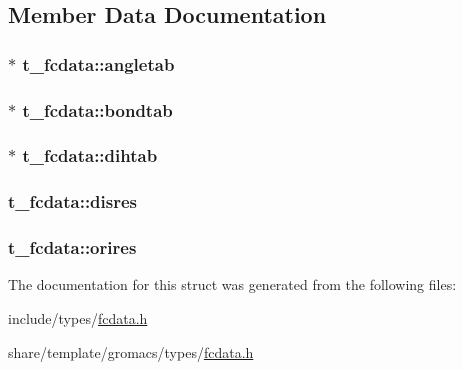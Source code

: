 \subsection{\-Member \-Data \-Documentation}
\hypertarget{structt__fcdata_abb2c29b026665e40a5e70234c55b2d51}{
\subsubsection[{angletab}]{ $\ast$ {\bf t\-\_\-fcdata\-::angletab}}}\label{structt__fcdata_abb2c29b026665e40a5e70234c55b2d51}
\hypertarget{structt__fcdata_a4efc8f3e6f22eae188fac8fedf865382}{
\subsubsection[{bondtab}]{ $\ast$ {\bf t\-\_\-fcdata\-::bondtab}}}\label{structt__fcdata_a4efc8f3e6f22eae188fac8fedf865382}
\hypertarget{structt__fcdata_a6342da34fb6df67d3d2e3babeaaae3ec}{
\subsubsection[{dihtab}]{ $\ast$ {\bf t\-\_\-fcdata\-::dihtab}}}\label{structt__fcdata_a6342da34fb6df67d3d2e3babeaaae3ec}
\hypertarget{structt__fcdata_ab08031231076f48cbbc06a2e852fd6ba}{
\subsubsection[{disres}]{ {\bf t\-\_\-fcdata\-::disres}}}\label{structt__fcdata_ab08031231076f48cbbc06a2e852fd6ba}
\hypertarget{structt__fcdata_a31b52d818c8f5092c32bc33a2ab9e975}{
\subsubsection[{orires}]{ {\bf t\-\_\-fcdata\-::orires}}}\label{structt__fcdata_a31b52d818c8f5092c32bc33a2ab9e975}


\-The documentation for this struct was generated from the following files\-:\begin{DoxyCompactItemize}
\item 
include/types/\hyperlink{include_2types_2fcdata_8h}{fcdata.\-h}\item 
share/template/gromacs/types/\hyperlink{share_2template_2gromacs_2types_2fcdata_8h}{fcdata.\-h}\end{DoxyCompactItemize}
